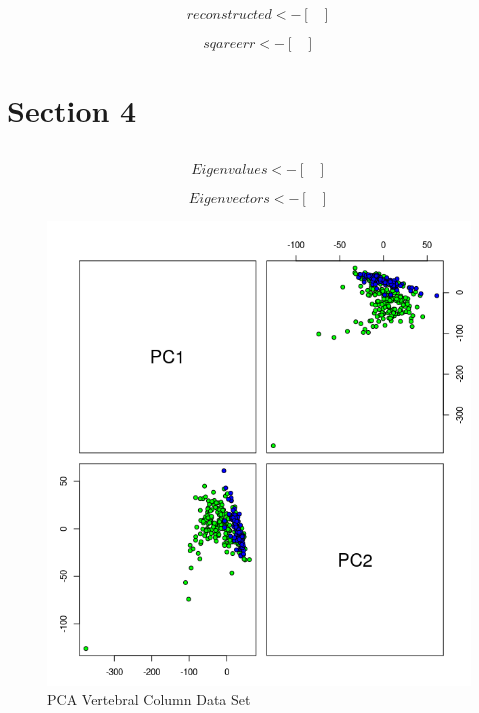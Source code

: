 \documentclass{report}
\begin{document}
\[
  reconstructed <- 
  \begin{bmatrix}
  \end{bmatrix}
\]

\[
  sqareerr <- 
  \begin{bmatrix}
  \end{bmatrix}
\]

\chapter{Section 4}

\begin{verbatim}	
\end{verbatim}

\[
  Eigenvalues <- 
  \begin{bmatrix}
  \end{bmatrix}
\]

\[
  Eigenvectors <- 
  \begin{bmatrix}
  \end{bmatrix}
\]

\begin{figure}[H]
  \includegraphics[width=\linewidth]{pca_vertebral_column_data_set.png}
  \caption{PCA Vertebral Column Data Set}
  \label{fig:PCAVertebralColumnDataSetScatterPlot}
\end{figure}
\end{document}
